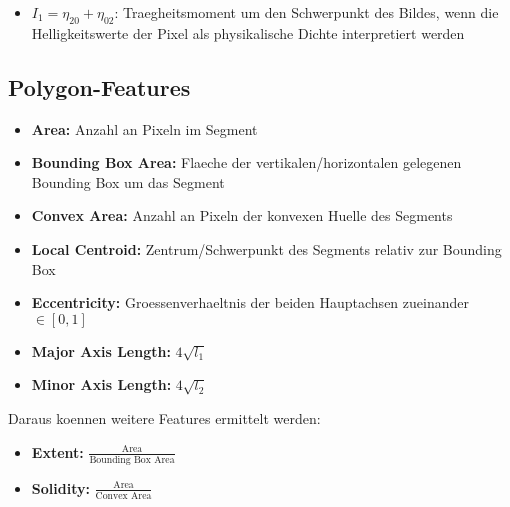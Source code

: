 \begin{itemize}
  \item $I_1 = \eta_{20} + \eta_{02}$: Traegheitsmoment um den Schwerpunkt des Bildes, wenn die Helligkeitswerte der Pixel als physikalische Dichte interpretiert werden
\end{itemize}

\subsection{Polygon-Features}

\begin{itemize}
  \item \textbf{Area:} Anzahl an Pixeln im Segment
  \item \textbf{Bounding Box Area:} Flaeche der vertikalen/horizontalen gelegenen Bounding Box um das Segment
  \item \textbf{Convex Area:} Anzahl an Pixeln der konvexen Huelle des Segments
  \item \textbf{Local Centroid:} Zentrum/Schwerpunkt des Segments relativ zur Bounding Box
  \item \textbf{Eccentricity:} Groessenverhaeltnis der beiden Hauptachsen zueinander $\in [0, 1]$
  \item \textbf{Major Axis Length:} $4 \sqrt{l_1}$
  \item \textbf{Minor Axis Length:} $4 \sqrt{l_2}$
\end{itemize}

Daraus koennen weitere Features ermittelt werden:

\begin{itemize}
  \item \textbf{Extent:} $\frac{\text{Area}}{\text{Bounding Box Area}}$
  \item \textbf{Solidity:} $\frac{\text{Area}}{\text{Convex Area}}$
\end{itemize}

